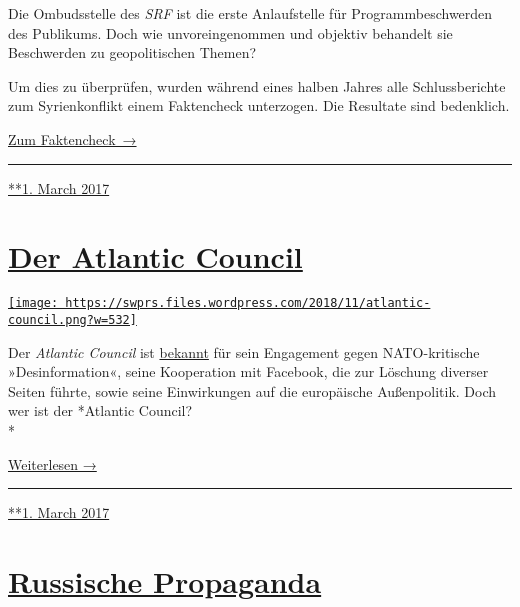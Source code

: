 Die Ombudsstelle des \emph{SRF} ist die erste Anlaufstelle für
Programm­be­schwerden des Publi­kums. Doch wie un­vor­ein­ge­nommen und
objektiv behandelt sie Beschwerden zu geo­po­li­tischen Themen?

Um dies zu über­prüfen, wurden während eines halben Jahres alle
Schluss­be­richte zum Syrien­kon­flikt einem Fakten­check unter­zogen.
Die Resul­tate sind bedenk­lich.

\href{https://swprs.org/srf-ombudsstelle-im-faktencheck/}{Zum
Faktencheck~→}

\begin{center}\rule{0.5\linewidth}{\linethickness}\end{center}

\href{https://swprs.org/2017/03/01/medienaufsicht-faktencheck/}{**1.
March 2017}

\hypertarget{der-atlantic-council}{%
\section{\texorpdfstring{\href{https://swprs.org/2017/03/01/der-atlantic-council/}{Der
Atlantic Council}}{Der Atlantic Council}}\label{der-atlantic-council}}

\href{https://swprs.org/2017/03/01/der-atlantic-council/}{\texttt{[image: https://swprs.files.wordpress.com/2018/11/atlantic-council.png?w=532]}}

Der \emph{Atlantic Council} ist
\href{https://www.rubikon.news/artikel/facebook-als-waffe}{bekannt} für
sein En­ga­ge­ment gegen NATO-kritische »Des­in­for­ma­tion«, seine
Kooperation mit Facebook, die zur Lö­schung diverser Seiten führte,
sowie seine Ein­wir­kungen auf die eu­ro­pä­ische Außen­politik. Doch
wer ist der *Atlantic Council?\\
*

\href{https://swprs.org/atlantic-council/}{Weiterlesen →}

\begin{center}\rule{0.5\linewidth}{\linethickness}\end{center}

\href{https://swprs.org/2017/03/01/der-atlantic-council/}{**1. March
2017}

\hypertarget{russische-propaganda}{%
\section{\texorpdfstring{\href{https://swprs.org/2017/03/01/russische-propaganda/}{Russische
Propaganda}}{Russische Propaganda}}\label{russische-propaganda}}

